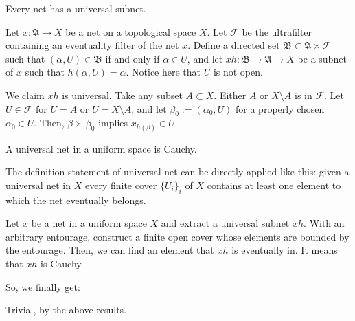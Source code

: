 \documentclass[11pt]{amsart}
\begin{document}
\begin{thm}
Every net has a universal subnet.
\end{thm}
\begin{pf}
Let $x:\mathfrak{A}\to X$ be a net on a topological space $X$.
Let $\mathcal{F}$ be the ultrafilter containing an eventuality filter of the net $x$.
Define a directed set $\mathfrak{B}\subset\mathfrak{A}\times\mathcal{F}$ such that $(\alpha,U)\in\mathfrak{B}$ if and only if $\alpha\in U$, and let $xh:\mathfrak{B}\to\mathfrak{A}\to X$ be a subnet of $x$ such that $h(\alpha,U)=\alpha$.
Notice here that $U$ is not open.

We claim $xh$ is universal.
Take any subset $A\subset X$.
Either $A$ or $X\setminus A$ is in $\mathcal{F}$.
Let $U\in\mathcal{F}$ for $U=A$ or $U=X\setminus A$, and let $\beta_0:=(\alpha_0,U)$ for a properly chosen $\alpha_0\in U$.
Then, $\beta\succ\beta_0$ implies $x_{h(\beta)}\in U$.
\end{pf}

\begin{thm}
A universal net in a uniform space is Cauchy.
\end{thm}
\begin{pf}
The definition statement of universal net can be directly applied like this: given a universal net in $X$ every finite cover $\{U_i\}_i$ of $X$ contains at least one element to which the net eventually belongs.

Let $x$ be a net in a uniform space $X$ and extract a universal subnet $xh$.
With an arbitrary entourage, construct a finite open cover whose elements are bounded by the entourage.
Then, we can find an element that $xh$ is eventually in.
It means that $xh$ is Cauchy.
\end{pf}

So, we finally get:

\begin{pf}[3 of Theorem 1.1.]
Trivial, by the above results.
\end{pf}




\end{document}
